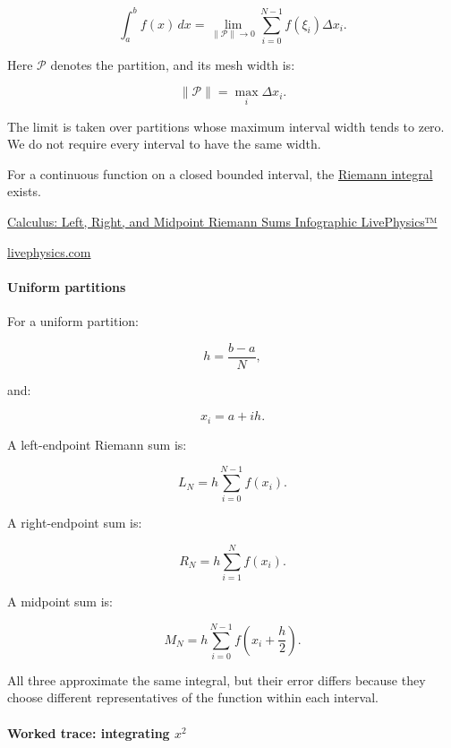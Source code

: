 \[
\boxed{ \int_a^b f(x)\,dx = \lim_{\|\mathcal P\|\to0} \sum_{i=0}^{N-1}f(\xi_i)\Delta x_i }.
\]

Here \(\mathcal P\) denotes the partition, and its mesh width is:

\[
\|\mathcal P\|=\max_i\Delta x_i.
\]

The limit is taken over partitions whose maximum interval width tends to zero. We do not require every interval to have the same width.

For a continuous function on a closed bounded interval, the \hyperref[02-foundations-ii-ch022-integration-and-quadrature]{Riemann integral} exists.

\href{https://images.openai.com/static-rsc-4/t5MkAz-2qFGici8ndHfZur9gQtfdWJYL32F6n8G88ZHPGmAsnDRse5qe5xfYJJ4GJcZqh8uYwSaYHOu9cPkLr8aB6FomkHL4VOpXoOryLK4Ee1f_NR5LPcOGaSAMPsLd58tQ6P4H7c9PoHrfy0mY3unWO2wadUnb798uxKmCL0Y?purpose=inline}{Calculus: Left, Right, and Midpoint Riemann Sums Infographic \textbar{} LivePhysics™}

\href{https://livephysics.com/infographics/calculus-left-right-and-midpoint-riemann-sums/?utm_source=chatgpt.com}{livephysics.com}

\paragraph{Uniform partitions}\label{02-foundations-ii-ch022-uniform-partitions}

For a uniform partition:

\[
h=\frac{b-a}{N},
\]

and:

\[
x_i=a+ih.
\]

A left-endpoint Riemann sum is:

\[
L_N=h\sum_{i=0}^{N-1}f(x_i).
\]

A right-endpoint sum is:

\[
R_N=h\sum_{i=1}^{N}f(x_i).
\]

A midpoint sum is:

\[
M_N=h\sum_{i=0}^{N-1}f\left(x_i+\frac h2\right).
\]

All three approximate the same integral, but their error differs because they choose different representatives of the function within each interval.

\paragraph{\texorpdfstring{Worked trace: integrating \(x^2\)}{Worked trace: integrating x\^{}2}}\label{02-foundations-ii-ch022-worked-trace-integrating-x2}

